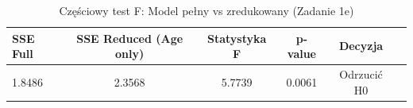 \begin{table}[H]
\caption{Częściowy test F: Model pełny vs zredukowany (Zadanie 1e)}
\label{tab:zad1_compare}
\begin{tabular}{lccccc}
\toprule
SSE Full & SSE Reduced (Age only) & Statystyka F & p-value & Decyzja \\
\midrule
1.8486 & 2.3568 & 5.7739 & 0.0061 & Odrzucić H0 \\
\bottomrule
\end{tabular}
\end{table}
